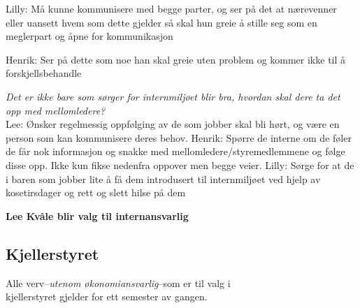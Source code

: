 \documentclass[10pt,norsk,a4paper]{article}
\begin{document}
\begin{multicols}{2}
Lilly: Må kunne kommunisere med begge parter, og ser på det at nærevenner eller
uansett hvem som dette gjelder så skal hun greie å stille seg som en
meglerpart og åpne for kommunikasjon

Henrik: Ser på dette som noe han skal greie uten problem og kommer ikke til å
forskjellsbehandle


\textit{Det er ikke bare som sørger for internmiljøet blir bra, hvordan skal
dere ta det opp med mellomledere?}\\
Lee: Ønsker regelmessig oppfølging av de som jobber skal bli hørt, og være en
person som kan kommunisere deres behov.
Henrik: Spørre de interne om de føler de får nok informasjon og snakke med
mellomledere/styremedlemmene og følge disse opp. Ikke kun fikse nedenfra
oppover men begge veier.
Lilly: Sørge for at de i baren som jobber lite å få dem introdusert til
internmiljøet ved hjelp av kosetirsdager og rett og slett hilse på dem

\textbf{Lee Kvåle blir valg til internansvarlig}

\end{multicols}
\newpage
\subsection{Kjellerstyret}
Alle verv--\textit{utenom økonomiansvarlig}--som er til valg i \\kjellerstyret gjelder for ett semester av gangen.
\end{document}
